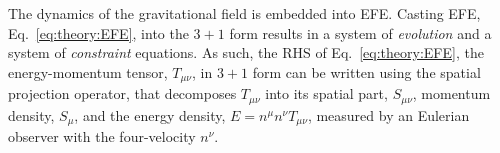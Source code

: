 



The dynamics of the gravitational field is embedded into \ac{EFE}. 
Casting \ac{EFE}, Eq.~\eqref{eq:theory:EFE}, into the $3+1$ form results in a 
system of \textit{evolution} and 
a system of \textit{constraint} equations.
%
%
%
%
%
As such, the \ac{RHS} of Eq.~\eqref{eq:theory:EFE}, the energy-momentum tensor, 
$T_{\mu\nu}$, in $3+1$ form can be written using the spatial projection operator, 
that decomposes $T_{\mu\nu}$ into its 
spatial part, $S_{\mu\nu}$, 
momentum density, $S_{\mu}$, and 
the energy density, $E=n^{\mu}n^{\nu}T_{\mu\nu}$, 
measured by an Eulerian observer with the four-velocity $n^{\nu}$.


